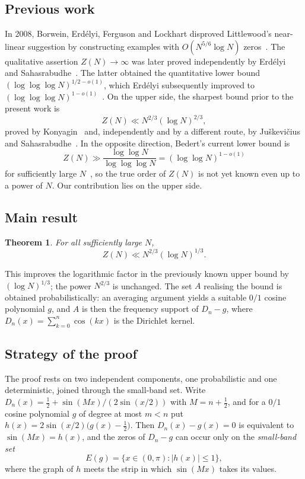 \documentclass[11pt,reqno]{amsart}
\theoremstyle{plain}
\newtheorem{theorem}{Theorem}
\theoremstyle{definition}
\theoremstyle{remark}
\begin{document}
\subsection*{Previous work}
In 2008, Borwein, Erd\'elyi, Ferguson and Lockhart disproved Littlewood's near-linear suggestion by constructing examples with $O(N^{5/6}\log N)$ zeros~\cite{BEFL}. The qualitative assertion $Z(N)\to\infty$ was later proved independently by Erd\'elyi~\cite{ErdelyiQual} and Sahasrabudhe~\cite{Sahasrabudhe}. The latter obtained the quantitative lower bound $(\log\log\log N)^{1/2-o(1)}$, which Erd\'elyi subsequently improved to $(\log\log\log N)^{1-o(1)}$~\cite{ErdelyiImproved}. On the upper side, the sharpest bound prior to the present work is
\[
Z(N)\ll N^{2/3}(\log N)^{2/3},
\]
proved by Konyagin~\cite{Konyagin} and, independently and by a different route, by Ju\v{s}kevi\v{c}ius and Sahasrabudhe~\cite{JS}. In the opposite direction, Bedert's current lower bound is
\[
Z(N)\gg \frac{\log\log N}{\log\log\log N}
       =(\log\log N)^{1-o(1)}
\]
for sufficiently large $N$~\cite{lower}, so the true order of $Z(N)$ is not yet known even up to a power of $N$. Our contribution lies on the upper side.

\subsection*{Main result}
\begin{theorem}\label{thm:main}
For all sufficiently large $N$,
\[
Z(N)\ll N^{2/3}(\log N)^{1/3}.
\]
\end{theorem}
This improves the logarithmic factor in the previously known upper bound by $(\log N)^{1/3}$; the power $N^{2/3}$ is unchanged. The set $A$ realising the bound is obtained probabilistically: an averaging argument yields a suitable $0/1$ cosine polynomial $g$, and $A$ is then the frequency support of $D_n-g$, where $D_n(x)=\sum_{k=0}^{n}\cos(kx)$ is the Dirichlet kernel.

\subsection*{Strategy of the proof}
The proof rests on two independent components, one probabilistic and one deterministic, joined through the small-band set. Write $D_n(x)=\tfrac12+\sin(Mx)/(2\sin(x/2))$ with $M=n+\tfrac12$, and for a $0/1$ cosine polynomial $g$ of degree at most $m<n$ put $h(x)=2\sin(x/2)\bigl(g(x)-\tfrac12\bigr)$. Then $D_n(x)-g(x)=0$ is equivalent to $\sin(Mx)=h(x)$, and the zeros of $D_n-g$ can occur only on the \emph{small-band set}
\[
E(g)=\{x\in(0,\pi): \lvert h(x)\rvert\le 1\},
\]
where the graph of $h$ meets the strip in which $\sin(Mx)$ takes its values.
\end{document}
